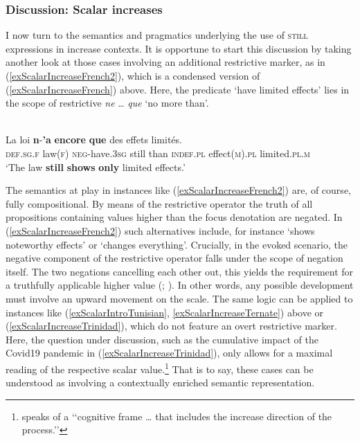 \subsubsection{Discussion: Scalar increases}
I now turn to the semantics and pragmatics underlying the use of \textsc{still} expressions in increase contexts. It is opportune to start this discussion by taking another look at those cases involving an additional restrictive marker, as in (\ref{exScalarIncreaseFrench2}), which is a condensed version of (\ref{exScalarIncreaseFrench}) above. Here, the predicate \lq have limited effects\rq{ }lies in the scope of restrictive \textit{ne} … \textit{que} \lq no more than\rq{}.

\begin{exe}
	\ex {}\label{exScalarIncreaseFrench2}\\
	\gll La loi \textbf{n}-\textbf{'a} \textbf{encore} \textbf{que} des effets limités.\\
	\textsc{def}.\textsc{sg}.\textsc{f} law(\textsc{f}) \textsc{neg}-have.3\textsc{sg} still than \textsc{indef}.\textsc{pl} effect(\textsc{m}).\textsc{pl} limited.\textsc{pl}.\textsc{m}\\
	\glt \lq The law \textbf{still} \textbf{shows} \textbf{only} limited effects.\rq{}
\end{exe}

The semantics at play in instances like (\ref{exScalarIncreaseFrench2}) are, of course, fully compositional. By means of the restrictive operator the truth of all propositions containing values higher than the focus denotation are negated. In (\ref{exScalarIncreaseFrench2}) such alternatives include, for instance \lq shows noteworthy effects\rq{ }or \lq changes everything\rq{}. Crucially, in the evoked  scenario, the negative component of the restrictive operator falls under the scope of negation itself. The two negations cancelling each other out, this yields the requirement for a truthfully applicable higher value (\cite{Garrido1992}; \cite[112]{Vandeweghe1992}). In other words, any possible development must involve an upward movement on the scale. The same logic can be applied to instances like (\ref{exScalarIntroTunisian}, \ref{exScalarIncreaseTernate}) above or (\ref{exScalarIncreaseTrinidad}), which do not feature an overt restrictive marker. Here, the question under discussion, such as the cumulative impact of the Covid19 pandemic in (\ref{exScalarIncreaseTrinidad}), only allows for a maximal reading of the respective scalar value.\footnote{\textcite[385 fn36]{Garrido1992} speaks of a \lq\lq cognitive frame … that includes the increase direction of the process.\rq\rq{}} That is to say, these cases can be understood as involving a contextually enriched semantic representation.

